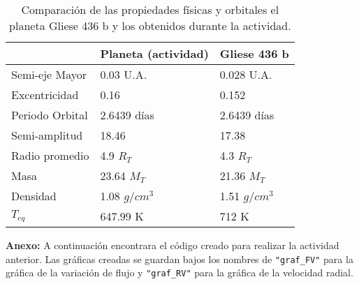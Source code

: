 \documentclass[12pt,letterpaper]{article}
\begin{document}
\begin{table}[H]
\centering
\begin{tabular}{lll}
\hline
                & Planeta (actividad)          & Gliese 436 b                 \\ \hline
Semi-eje Mayor  & 0.03 U.A.                    & 0.028 U.A.                   \\ \hline
Excentricidad   & 0.16                         & 0.152                        \\ \hline
Periodo Orbital & 2.6439 días                  & 2.6439 días                  \\ \hline
Semi-amplitud   & 18.46                        & 17.38                        \\ \hline
Radio promedio  & 4.9 $R_T$                     & 4.3 $R_T$                     \\ \hline
Masa            & 23.64 $M_T$                   & 21.36 $M_T$                   \\ \hline
Densidad        & 1.08 $g/cm^3$                 & 1.51 $g/cm^3$   \\ \hline
$T_{eq}$        & 647.99 K                     & 712 K                        \\ \hline
\end{tabular}
\caption{Comparación de las propiedades físicas y orbitales el planeta Gliese 436 b y los obtenidos durante la actividad. }
\end{table}
\textbf{Anexo:} A continuación encontrara el código creado para realizar la actividad anterior. Las gráficas creadas se guardan bajos los nombres de \texttt{"graf{\_}FV"} para la gráfica de la variación de flujo y \texttt{"graf{\_}RV"} para la gráfica de la velocidad radial.
\end{document}
